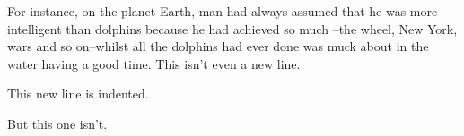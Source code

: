 \documentclass{article}
\begin{document}
For instance, on the planet Earth, man had always assumed that 
he was more intelligent than dolphins because he had achieved so much
--the wheel, New York, wars and so on--whilst all the dolphins had 
ever done was muck about in the water having a good time.
This isn't even a new line.  
	
This new line is indented.

But this one isn't.
\end{document}

